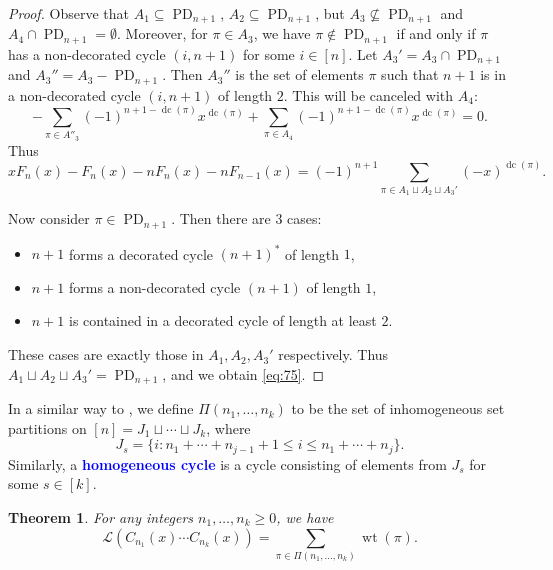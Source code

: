 \documentclass[oneside]{book}
\numberwithin{equation}{section}
\newtheorem{thm}{Theorem}[section]
\theoremstyle{definition}
\newcommand\PD{\operatorname{PD}}
\newcommand\dc{\operatorname{dc}}
\newcommand\LL{\mathcal{L}}
\newcommand\wt{\operatorname{wt}}
\renewcommand\emph[1]{\textcolor{blue}{\bf #1}}
\begin{document}
\begin{proof}
 Observe that \( A_1\subseteq \PD_{n+1} \),
 \( A_2\subseteq \PD_{n+1} \), but \( A_3 \not\subseteq \PD_{n+1} \)
 and \( A_4 \cap \PD_{n+1} = \emptyset \). Moreover, for
 \( \pi\in A_3 \), we have \( \pi\not \in \PD_{n+1} \) if and only if
 \( \pi \) has a non-decorated cycle \( (i,n+1) \) for some
 \( i\in[n] \). Let \( A_3' = A_3\cap \PD_{n+1} \) and
 \( A_3'' = A_3 - \PD_{n+1} \). Then \( A_3'' \) is the set of
 elements \( \pi \) such that \( n+1 \) is in a non-decorated cycle
 \( (i,n+1) \) of length \( 2 \). This will be canceled with
 \( A_4 \):
 \[
  - \sum_{\pi \in A''_3} (-1)^{n+1-\dc(\pi)}x^{\dc(\pi)} + \sum_{\pi \in
     A_4} (-1)^{n+1-\dc(\pi)}x^{\dc(\pi)} = 0.
 \]
 Thus
 \[
   xF_n(x)-F_n(x)-nF_n(x) - n F_{n-1}(x) = 
   (-1)^{n+1} \sum_{\pi \in A_1\sqcup A_2 \sqcup A_3'} (-x)^{\dc(\pi)} .
 \]

 Now consider \( \pi\in \PD_{n+1} \).
 Then there are 3 cases: 
 \begin{itemize}
 \item \( n+1 \) forms a decorated cycle \( (n+1)^* \) of length \( 1 \), 
 \item \( n+1 \) forms a non-decorated cycle \( (n+1) \) of length \( 1 \),
 \item \( n+1 \) is contained in a decorated cycle of length at least
   \( 2 \).
 \end{itemize}
 These cases are exactly those in \( A_1,A_2,A_3' \) respectively.
 Thus \( A_1\sqcup A_2 \sqcup A_3' = \PD_{n+1} \), and we obtain
 \eqref{eq:75}.
\end{proof}

In a similar way to , we define \( \Pi(n_1,\dots,n_k) \)
to be the set of inhomogeneous set partitions on
\( [n] = J_1 \sqcup \cdots \sqcup J_k \), where
\[
  J_s = \{ i: n_1 + \cdots + n_{j-1}+1 \le i\le n_1 + \cdots + n_j\}.
\]
Similarly, a \emph{homogeneous cycle} is a cycle consisting of elements from
\( J_s \) for some \( s\in [k]\). 

\begin{thm}
  For any integers \( n_1,\dots,n_k\ge0 \),
  we have
\[
  \LL(C_{n_1}(x)\cdots C_{n_k}(x))
  = \sum_{\pi \in \Pi(n_1,\dots,n_k)} \wt(\pi).
\]
\end{thm}
\end{document}
